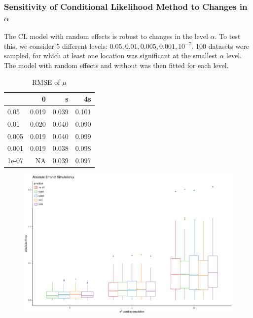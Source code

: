 \documentclass[AMA,STIX1COL]{WileyNJD-v2}\usepackage[]{graphicx}\usepackage[]{color}
\newenvironment{knitrout}{}{} %
\begin{document}
\subsubsection{Sensitivity of Conditional Likelihood Method to Changes in $\alpha$}

The CL model with random effects is robust to changes in the level $\alpha$. To test this, we consider 5 different levels: $0.05, 0.01, 0.005, 0.001, 10^{-7}$. 100 datasets were sampled, for which at least one location was significant at the smallest $\alpha$ level. The model with random effects and without was then fitted for each level. 



\begin{knitrout}
\color{fgcolor}\begin{table}

\caption{\label{tab:unnamed-chunk-28}RMSE of $\mu$}
\centering
\begin{tabular}[t]{l|r|r|r}
\hline
  & 0 & s & 4s\\
\hline
0.05 & 0.019 & 0.039 & 0.101\\
\hline
0.01 & 0.020 & 0.040 & 0.090\\
\hline
0.005 & 0.019 & 0.040 & 0.099\\
\hline
0.001 & 0.019 & 0.038 & 0.098\\
\hline
1e-07 & NA & 0.039 & 0.097\\
\hline
\end{tabular}
\end{table}


\end{knitrout}



\begin{figure}
\begin{knitrout}
\color{fgcolor}

{\centering \includegraphics[width=6in]{figure/unnamed-chunk-29-1} 

}



\end{knitrout}
\end{figure}
\end{document}
